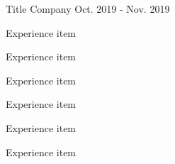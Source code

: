 \begin{cventries}
  \cventry
    {Title} %
    {Company} %
    {\null} %
    {Oct. 2019 - Nov. 2019} %
    {
      \begin{cvitems} %
        \item {Experience item}
        \item {Experience item}
        \item {Experience item}
        \item {Experience item}
        \item {Experience item}
        \item {Experience item}
      \end{cvitems}
    }


\end{cventries}
